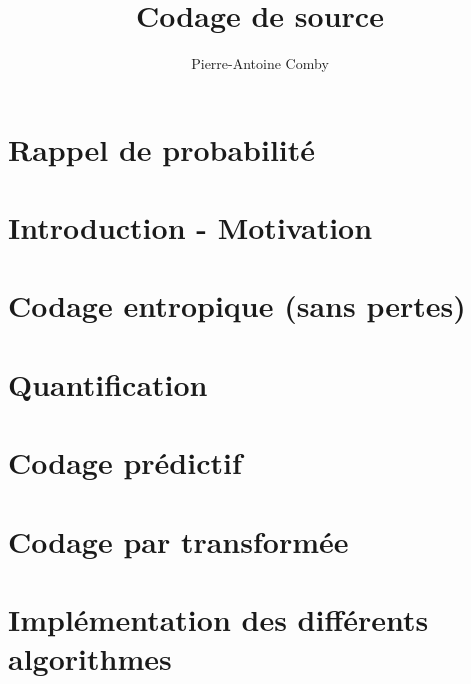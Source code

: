 \documentclass{../../cours}
\author{Pierre-Antoine Comby}
\title{Codage de source}
\begin{document}
\maketitle
\tableofcontents
\setcounter{chapter}{-1}
\chapter{Rappel de probabilité}

\chapter{Introduction - Motivation}

\chapter{Codage entropique (sans pertes)}

\chapter{Quantification}

\chapter{Codage prédictif}

\chapter{Codage par transformée}


\appendix
\chapter{Implémentation des différents algorithmes}

\end{document}

